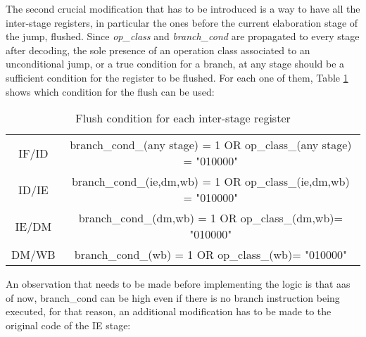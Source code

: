 The second crucial modification that has to be introduced is a way to have all the inter-stage registers, in particular the ones before the current elaboration stage of the jump, flushed. Since \emph{op{\_}class} and \emph{branch{\_}cond} are propagated to every stage after decoding, the sole presence of an operation class associated to an unconditional jump, or a true condition for a branch, at any stage should be a sufficient condition for the register to be flushed. For each one of them, Table \ref{table:flush_logic} shows which condition for the flush can be used: 

\begin{table}[!ht]
    \begin{center}
        \begin{tabular}{|c|c|}
            \hline
            IF/ID &  branch{\_}cond{\_}(any stage) = 1 OR op{\_}class{\_}(any stage) = "010000"   \\
            
            ID/IE &  branch{\_}cond{\_}(ie,dm,wb) = 1 OR op{\_}class{\_}(ie,dm,wb) = "010000"   \\
            
            IE/DM & branch{\_}cond{\_}(dm,wb) = 1 OR op{\_}class{\_}(dm,wb)= "010000"\\
            
            DM/WB & branch{\_}cond{\_}(wb) = 1 OR op{\_}class{\_}(wb)= "010000"\\
            
            \hline
        \end{tabular}
    \caption{Flush condition for each inter-stage register}
    \label{table:flush_logic}
    \end{center}
\end{table}
\newpage
An observation that needs to be made before implementing the logic is that aas of now, branch{\_}cond can be high even if there is no branch instruction being executed, for that reason, an additional modification has to be made to the original code of the IE stage:

